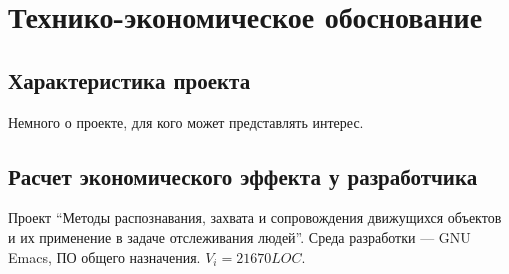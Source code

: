 \section{Технико-экономическое обоснование}

\subsection{Характеристика проекта}
Немного о проекте, для кого может представлять интерес.

\subsection{Расчет экономического эффекта у разработчика}
Проект ``Методы распознавания, захвата и сопровождения движущихся объектов и их применение в задаче отслеживания людей''. Среда разработки --- GNU Emacs, ПО общего назначения. \( V_i = 21670 LOC \).
\noindent

